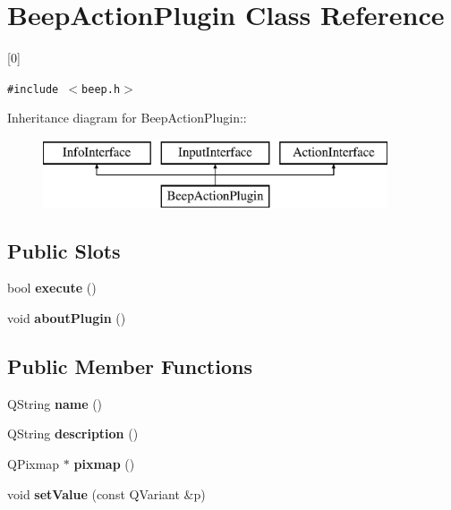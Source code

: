 \hypertarget{class_beep_action_plugin}{
\section{BeepActionPlugin Class Reference}
\label{class_beep_action_plugin}
}
\mbox{[}0\mbox{]}  


{\tt \#include $<$beep.h$>$}

Inheritance diagram for BeepActionPlugin::\begin{figure}[H]
\begin{center}
\leavevmode
\includegraphics[height=2cm]{class_beep_action_plugin}
\end{center}
\end{figure}
\subsection*{Public Slots}
\begin{CompactItemize}
\item 
\hypertarget{class_beep_action_plugin_307ce84ed8c1e425932d91f641d226c2}{
bool \textbf{execute} ()}
\label{class_beep_action_plugin_307ce84ed8c1e425932d91f641d226c2}

\item 
\hypertarget{class_beep_action_plugin_7edc8112b128dbfb773749c43a2754b4}{
void \textbf{aboutPlugin} ()}
\label{class_beep_action_plugin_7edc8112b128dbfb773749c43a2754b4}

\end{CompactItemize}
\subsection*{Public Member Functions}
\begin{CompactItemize}
\item 
\hypertarget{class_beep_action_plugin_b7bd9e72127a26f493b0aa839388cd04}{
QString \textbf{name} ()}
\label{class_beep_action_plugin_b7bd9e72127a26f493b0aa839388cd04}

\item 
\hypertarget{class_beep_action_plugin_00816ac9943210fe12d9ab426e17be2c}{
QString \textbf{description} ()}
\label{class_beep_action_plugin_00816ac9943210fe12d9ab426e17be2c}

\item 
\hypertarget{class_beep_action_plugin_00f5bb54c3c3b344f14d4d9c746f557c}{
QPixmap $\ast$ \textbf{pixmap} ()}
\label{class_beep_action_plugin_00f5bb54c3c3b344f14d4d9c746f557c}

\item 
\hypertarget{class_beep_action_plugin_32d6a80a79c1fecc1d548ebd06c4fd6d}{
void \textbf{setValue} (const QVariant \&p)}
\label{class_beep_action_plugin_32d6a80a79c1fecc1d548ebd06c4fd6d}

\end{CompactItemize}


